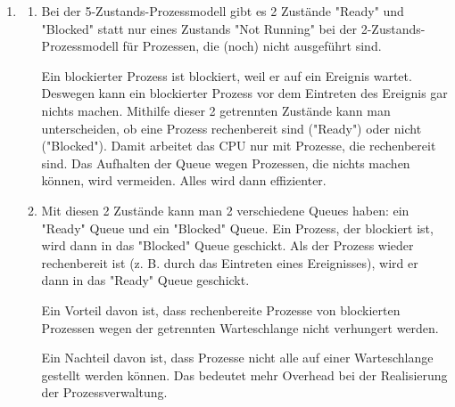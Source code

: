 \begin{enumerate}[label={Aufgabe H\arabic*},start=15]
	\item 
		\begin{enumerate}
			\item Bei der 5-Zustands-Prozessmodell gibt es 2 Zustände "Ready" und "Blocked" statt nur eines Zustands "Not Running" bei der 2-Zustands-Prozessmodell für Prozessen, die (noch) nicht ausgeführt sind. 

			Ein blockierter Prozess ist blockiert, weil er auf ein Ereignis wartet. Deswegen kann ein blockierter Prozess vor dem Eintreten des Ereignis gar nichts machen. Mithilfe dieser 2 getrennten Zustände kann man unterscheiden, ob eine Prozess rechenbereit sind ("Ready") oder nicht ("Blocked"). Damit arbeitet das CPU nur mit Prozesse, die rechenbereit sind. Das Aufhalten der Queue wegen Prozessen, die nichts machen können, wird vermeiden. Alles wird dann effizienter. 


			\item Mit diesen 2 Zustände kann man 2 verschiedene Queues haben: ein "Ready" Queue und ein "Blocked" Queue. Ein Prozess, der blockiert ist, wird dann in das "Blocked" Queue geschickt. Als der Prozess wieder rechenbereit ist (z. B. durch das Eintreten eines Ereignisses), wird er dann in das "Ready" Queue geschickt. 

			Ein Vorteil davon ist, dass rechenbereite Prozesse von blockierten Prozessen wegen der getrennten Warteschlange nicht verhungert werden.

			Ein Nachteil davon ist, dass Prozesse nicht alle auf einer Warteschlange gestellt werden können. Das bedeutet mehr Overhead bei der Realisierung der Prozessverwaltung.




\end{enumerate}
\end{enumerate}
